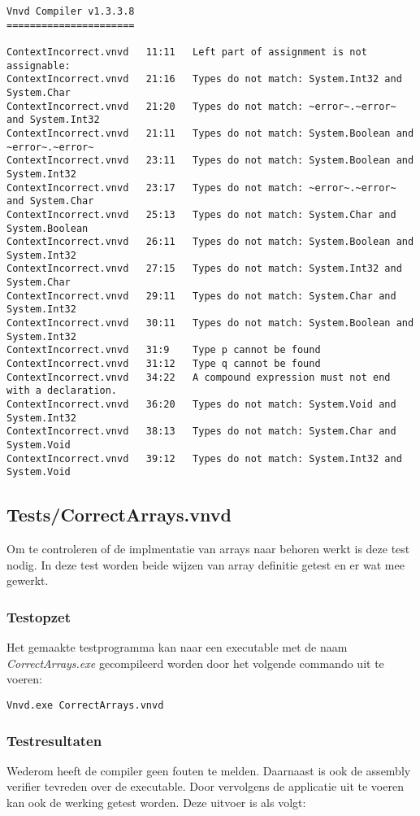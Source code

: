 \begin{lstlisting}
Vnvd Compiler v1.3.3.8
======================

ContextIncorrect.vnvd   11:11   Left part of assignment is not assignable:
ContextIncorrect.vnvd   21:16   Types do not match: System.Int32 and System.Char
ContextIncorrect.vnvd   21:20   Types do not match: ~error~.~error~ and System.Int32
ContextIncorrect.vnvd   21:11   Types do not match: System.Boolean and ~error~.~error~
ContextIncorrect.vnvd   23:11   Types do not match: System.Boolean and System.Int32
ContextIncorrect.vnvd   23:17   Types do not match: ~error~.~error~ and System.Char
ContextIncorrect.vnvd   25:13   Types do not match: System.Char and System.Boolean
ContextIncorrect.vnvd   26:11   Types do not match: System.Boolean and System.Int32
ContextIncorrect.vnvd   27:15   Types do not match: System.Int32 and System.Char
ContextIncorrect.vnvd   29:11   Types do not match: System.Char and System.Int32
ContextIncorrect.vnvd   30:11   Types do not match: System.Boolean and System.Int32
ContextIncorrect.vnvd   31:9    Type p cannot be found
ContextIncorrect.vnvd   31:12   Type q cannot be found
ContextIncorrect.vnvd   34:22   A compound expression must not end with a declaration.
ContextIncorrect.vnvd   36:20   Types do not match: System.Void and System.Int32
ContextIncorrect.vnvd   38:13   Types do not match: System.Char and System.Void
ContextIncorrect.vnvd   39:12   Types do not match: System.Int32 and System.Void
\end{lstlisting}

\subsection{Tests/CorrectArrays.vnvd}
Om te controleren of de implmentatie van arrays naar behoren werkt is deze test nodig. In deze test worden beide wijzen van array definitie getest en er wat mee gewerkt.

\subsubsection{Testopzet}
Het gemaakte testprogramma kan naar een executable met de naam \textit{CorrectArrays.exe} gecompileerd worden door het volgende commando uit te voeren:

\begin{lstlisting}
Vnvd.exe CorrectArrays.vnvd
\end{lstlisting}

\subsubsection{Testresultaten}
Wederom heeft de compiler geen fouten te melden. Daarnaast is ook de assembly verifier tevreden over de executable. Door vervolgens de applicatie uit te voeren kan ook de werking getest worden. Deze uitvoer is als volgt:

